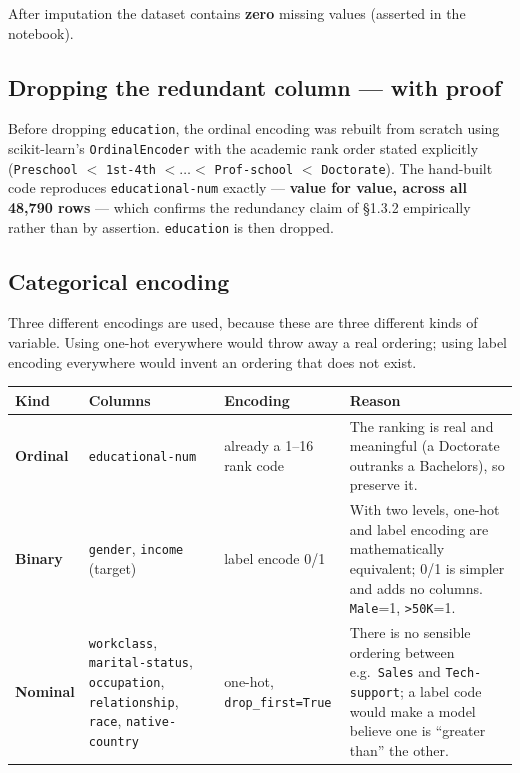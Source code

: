 \documentclass[11pt,a4paper]{article}
\newcommand{\code}[1]{\texttt{\small #1}}
\begin{document}
\medskip
\noindent
After imputation the dataset contains \textbf{zero} missing values (asserted in the
notebook).

\subsection{Dropping the redundant column --- with proof}

Before dropping \code{education}, the ordinal encoding was rebuilt from scratch using
scikit-learn's \code{OrdinalEncoder} with the academic rank order stated explicitly
(\code{Preschool} $<$ \code{1st-4th} $<\dots<$ \code{Prof-school} $<$ \code{Doctorate}).
The hand-built code reproduces \code{educational-num} exactly --- \textbf{value for value,
across all 48{,}790 rows} --- which confirms the redundancy claim of \S1.3.2 empirically
rather than by assertion. \code{education} is then dropped.

\subsection{Categorical encoding}

Three different encodings are used, because these are three different kinds of variable.
Using one-hot everywhere would throw away a real ordering; using label encoding everywhere
would invent an ordering that does not exist.

\begin{table}[H]
\centering
\small
\begin{adjustbox}{max width=\linewidth}
\begin{tabular}{L{2.3cm}L{5.2cm}L{2.9cm}L{5.4cm}}
\toprule
\textbf{Kind} & \textbf{Columns} & \textbf{Encoding} & \textbf{Reason} \\
\midrule
\textbf{Ordinal} &
\code{educational-num} &
already a 1--16 rank code &
The ranking is real and meaningful (a Doctorate outranks a Bachelors), so preserve it. \\
\textbf{Binary} &
\code{gender}, \code{income} (target) &
label encode 0/1 &
With two levels, one-hot and label encoding are mathematically equivalent; 0/1 is simpler
and adds no columns. \code{Male}=1, \code{>50K}=1. \\
\textbf{Nominal} &
\code{workclass}, \code{marital-status}, \code{occupation}, \code{relationship},
\code{race}, \code{native-country} &
one-hot, \mbox{\code{drop\_first=True}} &
There is no sensible ordering between e.g.\ \code{Sales} and \code{Tech-support}; a label
code would make a model believe one is ``greater than'' the other. \\
\bottomrule
\end{tabular}
\end{adjustbox}
\end{table}
\end{document}

